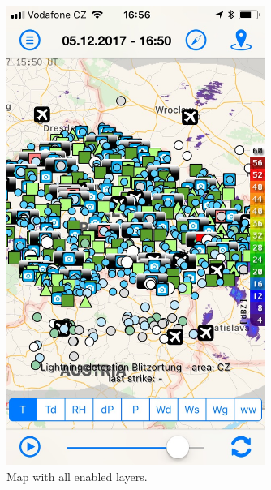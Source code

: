 \documentclass[11pt,a4paper]{article}
\begin{document}
\begin{figure}[htb]
    \centering
    \begin{minipage}[b]{0.49\textwidth}
    \centering
        \includegraphics[width=0.75\textwidth]{all-layers}
        \caption{Map with all enabled layers.}
        \label{fig:all}
    \end{minipage}
    \hfill
    \begin{minipage}[b]{0.49\textwidth}
    \centering

\end{minipage}
\end{figure}
\end{document}
